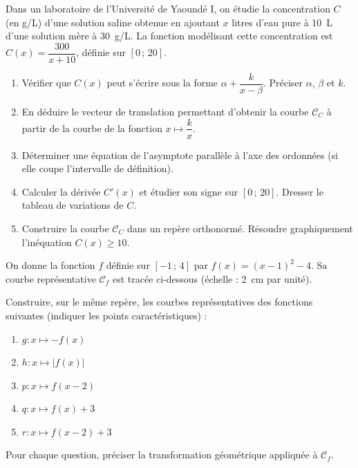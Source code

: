 \documentclass[11pt]{article}
\begin{document}
\begin{exercice}
Dans un laboratoire de l'Université de Yaoundé I, on étudie la concentration $C$ (en g/L) d'une solution saline obtenue en ajoutant $x$ litres d'eau pure à \SI{10}{L} d'une solution mère à \SI{30}{g/L}. La fonction modélisant cette concentration est $C(x) = \dfrac{300}{x+10}$, définie sur $[0\,;\,20]$.
\begin{enumerate}
    \item Vérifier que $C(x)$ peut s'écrire sous la forme $\alpha + \dfrac{k}{x-\beta}$. Préciser $\alpha$, $\beta$ et $k$.
    \item En déduire le vecteur de translation permettant d'obtenir la courbe $\mathcal{C}_C$ à partir de la courbe de la fonction $x \mapsto \dfrac{k}{x}$.
    \item Déterminer une équation de l'asymptote parallèle à l'axe des ordonnées (si elle coupe l'intervalle de définition).
    \item Calculer la dérivée $C'(x)$ et étudier son signe sur $[0\,;\,20]$. Dresser le tableau de variations de $C$.
    \item Construire la courbe $\mathcal{C}_C$ dans un repère orthonormé. Résoudre graphiquement l'inéquation $C(x) \geq 10$.
\end{enumerate}
\end{exercice}

\begin{exercice}
On donne la fonction $f$ définie sur $[-1\,;\,4]$ par $f(x) = (x-1)^2 - 4$. Sa courbe représentative $\mathcal{C}_f$ est tracée ci-dessous (échelle : \SI{2}{cm} par unité).
\begin{center}
\end{center}
Construire, sur le même repère, les courbes représentatives des fonctions suivantes (indiquer les points caractéristiques) :
\begin{enumerate}
    \item $g : x \mapsto -f(x)$
    \item $h : x \mapsto |f(x)|$
    \item $p : x \mapsto f(x-2)$
    \item $q : x \mapsto f(x) + 3$
    \item $r : x \mapsto f(x-2) + 3$
\end{enumerate}
Pour chaque question, préciser la transformation géométrique appliquée à $\mathcal{C}_f$.
\end{exercice}
\end{document}
